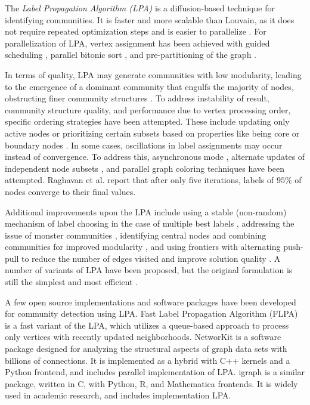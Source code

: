 The \textit{Label Propagation Algorithm (LPA)} is a diffusion-based technique for identifying communities. It is faster and more scalable than Louvain, as it does not require repeated optimization steps and is easier to parallelize \cite{com-newman04, com-raghavan07}. For parallelization of LPA, vertex assignment has been achieved with guided scheduling \cite{staudt2015engineering}, parallel bitonic sort \cite{soman2011fast}, and pre-partitioning of the graph \cite{kuzmin2015parallelizing}.

In terms of quality, LPA may generate communities with low modularity, leading to the emergence of a dominant community that engulfs the majority of nodes, obstructing finer community structures \cite{com-gregory10}. To address instability of result, community structure quality, and performance due to vertex processing order, specific ordering strategies have been attempted. These include updating only active nodes \cite{xie2011community} or prioritizing certain subsets based on properties like being core or boundary nodes \cite{gui2018community}. In some cases, oscillations in label assignments may occur instead of convergence. To address this, asynchronous mode \cite{leung2009towards}, alternate updates of independent node subsets \cite{cordasco2012label}, and parallel graph coloring techniques \cite{cordasco2012label} have been attempted. Raghavan et al. \cite{com-raghavan07} report that after only five iterations, labels of $95\%$ of nodes converge to their final values.

Additional improvements upon the LPA include using a stable (non-random) mechanism of label choosing in the case of multiple best labels \cite{com-xing14}, addressing the issue of monster communities \cite{com-berahmand18, com-sattari18}, identifying central nodes and combining communities for improved modularity \cite{com-you20}, and using frontiers with alternating push-pull to reduce the number of edges visited and improve solution quality \cite{com-liu20}. A number of variants of LPA have been proposed, but the original formulation is still the simplest and most efficient \cite{garza2019community}.

A few open source implementations and software packages have been developed for community detection using LPA. Fast Label Propagation Algorithm (FLPA) \cite{traag2023large} is a fast variant of the LPA, which utilizes a queue-based approach to process only vertices with recently updated neighborhoods. NetworKit \cite{staudt2016networkit} is a software package designed for analyzing the structural aspects of graph data sets with billions of connections. It is implemented as a hybrid with C++ kernels and a Python frontend, and includes parallel implementation of LPA. igraph \cite{csardi2006igraph} is a similar package, written in C, with Python, R, and Mathematica frontends. It is widely used in academic research, and includes implementation LPA.






